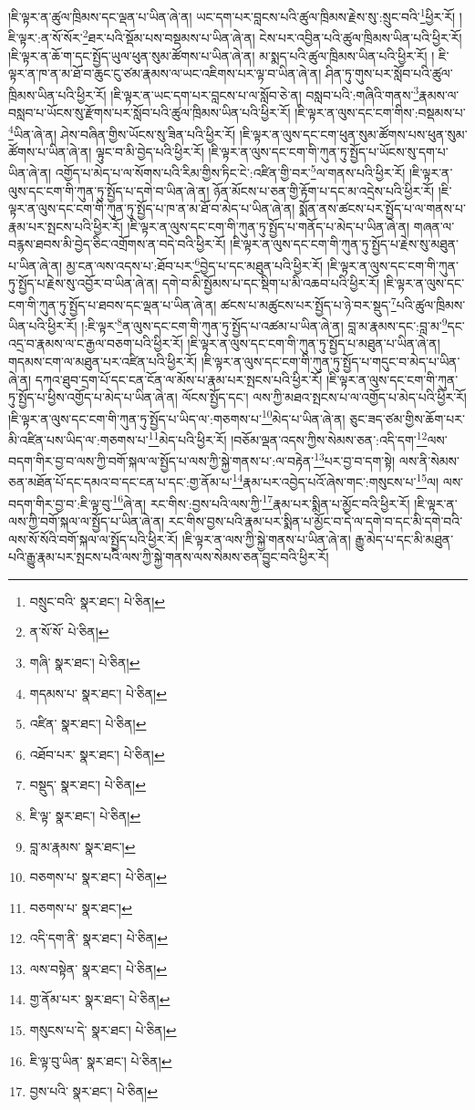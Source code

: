 །ཇི་ལྟར་ན་ཚུལ་ཁྲིམས་དང་ལྡན་པ་ཡིན་ཞེ་ན། ཡང་དག་པར་བླངས་པའི་ཚུལ་ཁྲིམས་རྗེས་སུ་:སྲུང་བའི་\footnote{བསྲུང་བའི་  སྣར་ཐང་།  པེ་ཅིན། }ཕྱིར་རོ། །ཇི་ལྟར་:ན་སོ་སོར་\footnote{ན་སོ་སོ་  པེ་ཅིན། }ཐར་པའི་སྡོམ་པས་བསྡམས་པ་ཡིན་ཞེ་ན། ངེས་པར་འབྱིན་པའི་ཚུལ་ཁྲིམས་ཡིན་པའི་ཕྱིར་རོ། །ཇི་ལྟར་ན་ཆོ་ག་དང་སྤྱོད་ཡུལ་ཕུན་སུམ་ཚོགས་པ་ཡིན་ཞེ་ན། མ་སྨད་པའི་ཚུལ་ཁྲིམས་ཡིན་པའི་ཕྱིར་རོ། །
ཇི་ལྟར་ན་ཁ་ན་མ་ཐོ་བ་ཆུང་ངུ་ཙམ་རྣམས་ལ་ཡང་འཇིགས་པར་ལྟ་བ་ཡིན་ཞེ་ན། ཤིན་ཏུ་གུས་པར་སློབ་པའི་ཚུལ་ཁྲིམས་ཡིན་པའི་ཕྱིར་རོ། །ཇི་ལྟར་ན་ཡང་དག་པར་བླངས་པ་ལ་སློབ་ཅེ་ན། བསླབ་པའི་:གཞིའི་གནས་\footnote{གཞི་  སྣར་ཐང་།  པེ་ཅིན། }རྣམས་ལ་བསླབ་པ་ཡོངས་སུ་རྫོགས་པར་སློབ་པའི་ཚུལ་ཁྲིམས་ཡིན་པའི་ཕྱིར་རོ། །ཇི་ལྟར་ན་ལུས་དང་ངག་གིས་:བསྡམས་པ་\footnote{གདམས་པ་  སྣར་ཐང་།  པེ་ཅིན། }ཡིན་ཞེ་ན། ཤེས་བཞིན་གྱིས་ཡོངས་སུ་ཟིན་པའི་ཕྱིར་རོ། །ཇི་ལྟར་ན་ལུས་དང་ངག་ཕུན་སུམ་ཚོགས་པས་ཕུན་སུམ་ཚོགས་པ་ཡིན་ཞེ་ན། ལྟུང་བ་མི་བྱེད་པའི་ཕྱིར་རོ། །ཇི་ལྟར་ན་ལུས་དང་ངག་གི་ཀུན་ཏུ་སྤྱོད་པ་ཡོངས་སུ་དག་པ་ཡིན་ཞེ་ན། འགྱོད་པ་མེད་པ་ལ་སོགས་པའི་རིམ་གྱིས་ཏིང་ངེ་:འཛིན་གྱི་བར་\footnote{འཛིན་  སྣར་ཐང་།  པེ་ཅིན། }ལ་གནས་པའི་ཕྱིར་རོ། །ཇི་ལྟར་ན་ལུས་དང་ངག་གི་ཀུན་ཏུ་སྤྱོད་པ་དགེ་བ་ཡིན་ཞེ་ན། ཉོན་མོངས་པ་ཅན་གྱི་རྟོག་པ་དང་མ་འདྲེས་པའི་ཕྱིར་རོ། །ཇི་ལྟར་ན་ལུས་དང་ངག་གི་ཀུན་ཏུ་སྤྱོད་པ་ཁ་ན་མ་ཐོ་བ་མེད་པ་ཡིན་ཞེ་ན། སྨོན་ནས་ཚངས་པར་སྤྱོད་པ་ལ་གནས་པ་རྣམ་པར་སྤངས་པའི་ཕྱིར་རོ། །ཇི་ལྟར་ན་ལུས་དང་ངག་གི་ཀུན་ཏུ་སྤྱོད་པ་གནོད་པ་མེད་པ་ཡིན་ཞེ་ན། གཞན་ལ་བརྙས་ཐབས་མི་བྱེད་ཅིང་འགྲོགས་ན་བདེ་བའི་ཕྱིར་རོ། །ཇི་ལྟར་ན་ལུས་དང་ངག་གི་ཀུན་ཏུ་སྤྱོད་པ་རྗེས་སུ་མཐུན་པ་ཡིན་ཞེ་ན། མྱ་ངན་ལས་འདས་པ་:ཐོབ་པར་\footnote{འཐོབ་པར་  སྣར་ཐང་།  པེ་ཅིན། }བྱེད་པ་དང་མཐུན་པའི་ཕྱིར་རོ། །ཇི་ལྟར་ན་ལུས་དང་ངག་གི་ཀུན་ཏུ་སྤྱོད་པ་རྗེས་སུ་འབྱོར་བ་ཡིན་ཞེ་ན། དགེ་བ་མི་སྤྱོམས་པ་དང་སྡིག་པ་མི་འཆབ་པའི་ཕྱིར་རོ། །ཇི་ལྟར་ན་ལུས་དང་ངག་གི་ཀུན་ཏུ་སྤྱོད་པ་ཐབས་དང་ལྡན་པ་ཡིན་ཞེ་ན། ཚངས་པ་མཚུངས་པར་སྤྱོད་པ་ཉེ་བར་སྡུད་\footnote{བསྡུད་  སྣར་ཐང་།  པེ་ཅིན། }པའི་ཚུལ་ཁྲིམས་ཡིན་པའི་ཕྱིར་རོ། །:ཇི་ལྟར་\footnote{ཇི་ལྟ་  སྣར་ཐང་།  པེ་ཅིན། }ན་ལུས་དང་ངག་གི་ཀུན་ཏུ་སྤྱོད་པ་འཚམ་པ་ཡིན་ཞེ་ན། བླ་མ་རྣམས་དང་:བླ་མ་\footnote{བླ་མ་རྣམས་  སྣར་ཐང་། }དང་འདྲ་བ་རྣམས་ལ་ང་རྒྱལ་བཅག་པའི་ཕྱིར་རོ། །ཇི་ལྟར་ན་ལུས་དང་ངག་གི་ཀུན་ཏུ་སྤྱོད་པ་མཐུན་པ་ཡིན་ཞེ་ན། གདམས་ངག་ལ་མཐུན་པར་འཛིན་པའི་ཕྱིར་རོ། །ཇི་ལྟར་ན་ལུས་དང་ངག་གི་ཀུན་ཏུ་སྤྱོད་པ་གདུང་བ་མེད་པ་ཡིན་ཞེ་ན། དཀའ་ཐུབ་དྲག་པོ་དང་ངན་ངོན་ལ་མོས་པ་རྣམ་པར་སྤངས་པའི་ཕྱིར་རོ། །ཇི་ལྟར་ན་ལུས་དང་ངག་གི་ཀུན་ཏུ་སྤྱོད་པ་ཕྱིས་འགྱོད་པ་མེད་པ་ཡིན་ཞེ་ན། ལོངས་སྤྱོད་དང་། ལས་ཀྱི་མཐའ་སྤངས་པ་ལ་འགྱོད་པ་མེད་པའི་ཕྱིར་རོ། །ཇི་ལྟར་ན་ལུས་དང་ངག་གི་ཀུན་ཏུ་སྤྱོད་པ་ཡིད་ལ་:གཅགས་པ་\footnote{བཅགས་པ་  སྣར་ཐང་།  པེ་ཅིན། }མེད་པ་ཡིན་ཞེ་ན། ཅུང་ཟད་ཙམ་གྱིས་ཆོག་པར་མི་འཛིན་པས་ཡིད་ལ་:གཅགས་པ་\footnote{བཅགས་པ་  སྣར་ཐང་། }མེད་པའི་ཕྱིར་རོ། །བཅོམ་ལྡན་འདས་ཀྱིས་སེམས་ཅན་:འདི་དག་\footnote{འདི་དག་ནི་  སྣར་ཐང་།  པེ་ཅིན། }ལས་བདག་གིར་བྱ་བ་ལས་ཀྱི་བགོ་སྐལ་ལ་སྤྱོད་པ་ལས་ཀྱི་སྐྱེ་གནས་པ་:ལ་བརྟེན་\footnote{ལས་བསྟེན་  སྣར་ཐང་།  པེ་ཅིན། }པར་བྱ་བ་དག་སྟེ། ལས་ནི་སེམས་ཅན་མཐོན་པོ་དང་དམའ་བ་དང་ངན་པ་དང་:གྱ་ནོམ་པ་\footnote{གྱ་ནོམ་པར་  སྣར་ཐང་།  པེ་ཅིན། }རྣམ་པར་འབྱེད་པའོ་ཞེས་གང་:གསུངས་པ་\footnote{གསུངས་པ་དེ་  སྣར་ཐང་།  པེ་ཅིན། }ལ། ལས་བདག་གིར་བྱ་བ་:ཇི་ལྟ་བུ་\footnote{ཇི་ལྟ་བུ་ཡིན་  སྣར་ཐང་།  པེ་ཅིན། }ཞེ་ན། རང་གིས་:བྱས་པའི་ལས་ཀྱི་\footnote{བྱས་པའི་  སྣར་ཐང་།  པེ་ཅིན། }རྣམ་པར་སྨིན་པ་མྱོང་བའི་ཕྱིར་རོ། །ཇི་ལྟར་ན་ལས་ཀྱི་བགོ་སྐལ་ལ་སྤྱོད་པ་ཡིན་ཞེ་ན། རང་གིས་བྱས་པའི་རྣམ་པར་སྨིན་པ་མྱོང་བ་དེ་ལ་དགེ་བ་དང་མི་དགེ་བའི་ལས་སོ་སོའི་བགོ་སྐལ་ལ་སྤྱོད་པའི་ཕྱིར་རོ། །ཇི་ལྟར་ན་ལས་ཀྱི་སྐྱེ་གནས་པ་ཡིན་ཞེ་ན། རྒྱུ་མེད་པ་དང་མི་མཐུན་པའི་རྒྱུ་རྣམ་པར་སྤངས་པའི་ལས་ཀྱི་སྐྱེ་གནས་ལས་སེམས་ཅན་བྱུང་བའི་ཕྱིར་རོ། 